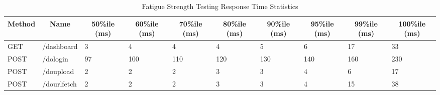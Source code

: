 \begin{table*}[]
  \caption{Fatigue Strength Testing Response Time Statistics}
  \label{tab:fstrespstat}
  \begin{tabular}{|l|l|l|l|l|l|l|l|l|l|}
    \hline
    \multicolumn{1}{|c|}{\textbf{Method}} & \multicolumn{1}{c|}{\textbf{Name}} & \multicolumn{1}{c|}{\textbf{50\%ile (ms)}} & \multicolumn{1}{c|}{\textbf{60\%ile (ms)}} & \multicolumn{1}{c|}{\textbf{70\%ile (ms)}} & \multicolumn{1}{c|}{\textbf{80\%ile (ms)}} & \multicolumn{1}{c|}{\textbf{90\%ile (ms)}} & \multicolumn{1}{c|}{\textbf{95\%ile (ms)}} & \multicolumn{1}{c|}{\textbf{99\%ile (ms)}} & \multicolumn{1}{c|}{\textbf{100\%ile (ms)}} \\ \hline
    GET                                   & /dashboard                         & 3                                          & 4                                          & 4                                          & 4                                          & 5                                          & 6                                          & 17                                         & 33                                          \\ \hline
    POST                                  & /dologin                           & 97                                         & 100                                        & 110                                        & 120                                        & 130                                        & 140                                        & 160                                        & 230                                         \\ \hline
    POST                                  & /doupload                          & 2                                          & 2                                          & 2                                          & 3                                          & 3                                          & 4                                          & 6                                          & 17                                          \\ \hline
    POST                                  & /dourlfetch                        & 2                                          & 2                                          & 2                                          & 3                                          & 3                                          & 4                                          & 15                                         & 38                                          \\ \hline

\end{tabular}
\end{table*}

